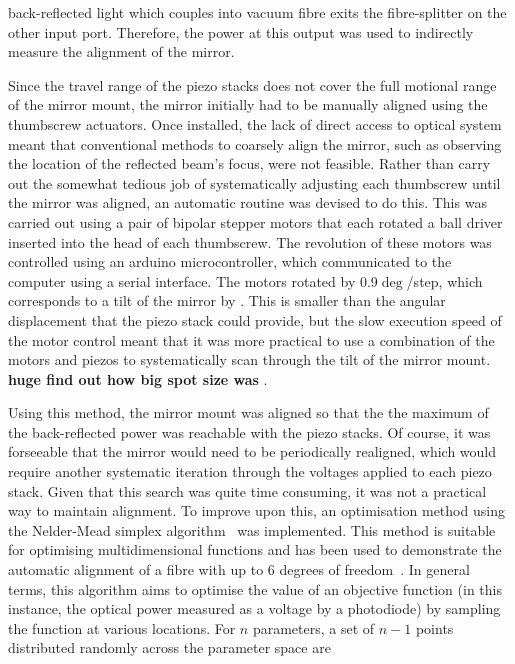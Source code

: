 back-reflected light which couples into vacuum fibre exits the fibre-splitter on
the other input port. Therefore, the power at this output was used to indirectly
measure the alignment of the mirror.  \par\noindent Since the travel range of
the piezo stacks does not cover the full motional range of the mirror mount, the
mirror initially had to be manually aligned using the thumbscrew actuators. Once
installed, the lack of direct access to optical system meant that conventional
methods to coarsely align the mirror, such as observing the location of the
reflected beam's focus, were not feasible. Rather than carry out the somewhat
tedious job of systematically adjusting each thumbscrew until the mirror was
aligned, an automatic routine was devised to do this. This was carried out using
a pair of bipolar stepper motors that each rotated a ball driver inserted into
the head of each thumbscrew. The revolution of these motors was controlled using
an arduino microcontroller, which communicated to the computer using a serial
interface.  The motors rotated by 0.9\(\deg\)/step, which corresponds to a tilt
of the mirror by . This is smaller than the
 angular displacement that the piezo stack could
provide, but the slow execution speed of the motor control meant that it was
more practical to use a combination of the motors and piezos to systematically
scan through the tilt of the mirror mount.  {\textbf {huge find out how big spot
size was }}. \par\noindent Using this method, the mirror mount was aligned so
that the the maximum of the back-reflected power was reachable with the piezo
stacks. Of course, it was forseeable that the mirror would need to be
periodically realigned, which would require another systematic iteration through
the voltages applied to each piezo stack. Given that this search was quite time
consuming, it was not a practical way to maintain alignment. To improve upon
this, an optimisation method using the Nelder-Mead simplex
algorithm~\cite{Nelder1965} was implemented. This method is suitable for
optimising multidimensional functions and has been used to demonstrate the
automatic alignment of a fibre with up to 6 degrees of freedom~\cite{Zhang2004}.
In general terms, this algorithm aims to optimise the value of an objective
function (in this instance, the optical power measured as a voltage by a
photodiode) by sampling the function at various locations. For \(n\) parameters,
a set of \(n-1\) points distributed randomly across the parameter space are
